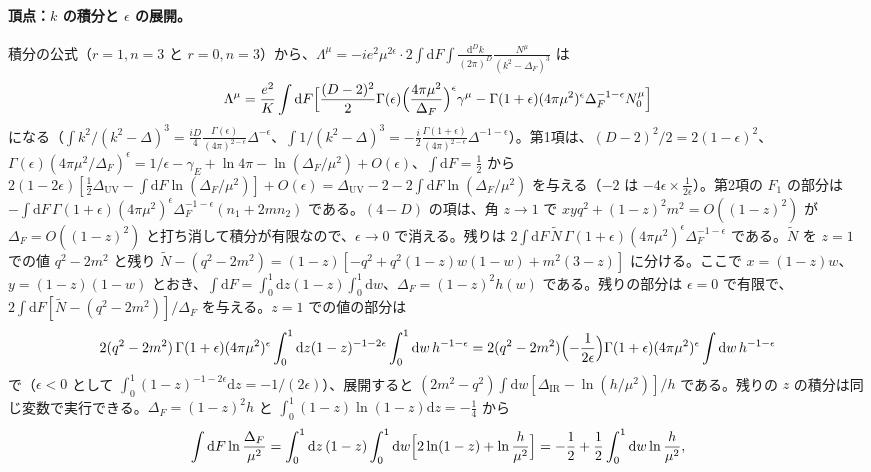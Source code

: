 \documentclass[a4paper,10pt]{ltjsarticle}
\newcommand{\dd}{\mathrm{d}}
\newcommand{\DUV}{\Delta_{\mathrm{UV}}}
\newcommand{\DIR}{\Delta_{\mathrm{IR}}}
\begin{document}
\paragraph{頂点：$k$ の積分と $\epsilon$ の展開。}積分の公式（$r=1,n=3$ と $r=0,n=3$）から、$\Lambda^\mu=-ie^2\mu^{2\epsilon}\cdot2\int\dd F\int\frac{\dd^Dk}{(2\pi)^D}\frac{N^\mu}{(k^2-\Delta_F)^3}$ は
\begin{equation*}
\Lambda^\mu=\frac{e^2}{K}\int\dd F\Bigl[\frac{(D-2)^2}{2}\Gamma(\epsilon)\Bigl(\frac{4\pi\mu^2}{\Delta_F}\Bigr)^{\epsilon}\gamma^\mu-\Gamma(1+\epsilon)(4\pi\mu^2)^\epsilon\Delta_F^{-1-\epsilon}N_0^\mu\Bigr]
\end{equation*}
になる（$\int k^2/(k^2-\Delta)^3=\frac{iD}{4}\frac{\Gamma(\epsilon)}{(4\pi)^{2-\epsilon}}\Delta^{-\epsilon}$、$\int1/(k^2-\Delta)^3=-\frac{i}{2}\frac{\Gamma(1+\epsilon)}{(4\pi)^{2-\epsilon}}\Delta^{-1-\epsilon}$）。第1項は、$(D-2)^2/2=2(1-\epsilon)^2$、$\Gamma(\epsilon)(4\pi\mu^2/\Delta_F)^\epsilon=1/\epsilon-\gamma_E+\ln4\pi-\ln(\Delta_F/\mu^2)+O(\epsilon)$、$\int\dd F=\frac12$ から $2(1-2\epsilon)[\frac12\DUV-\int\dd F\ln(\Delta_F/\mu^2)]+O(\epsilon)=\DUV-2-2\int\dd F\ln(\Delta_F/\mu^2)$ を与える（$-2$ は $-4\epsilon\times\frac{1}{2\epsilon}$）。第2項の $F_1$ の部分は $-\int\dd F\,\Gamma(1+\epsilon)(4\pi\mu^2)^\epsilon\Delta_F^{-1-\epsilon}(n_1+2mn_2)$ である。$(4-D)$ の項は、角 $z\to1$ で $xy q^2+(1-z)^2m^2=O((1-z)^2)$ が $\Delta_F=O((1-z)^2)$ と打ち消して積分が有限なので、$\epsilon\to0$ で消える。残りは $2\int\dd F\,\tilde N\,\Gamma(1+\epsilon)(4\pi\mu^2)^\epsilon\Delta_F^{-1-\epsilon}$ である。$\tilde N$ を $z=1$ での値 $q^2-2m^2$ と残り $\tilde N-(q^2-2m^2)=(1-z)[-q^2+q^2(1-z)w(1-w)+m^2(3-z)]$ に分ける。ここで $x=(1-z)w$、$y=(1-z)(1-w)$ とおき、$\int\dd F=\int_0^1\dd z(1-z)\int_0^1\dd w$、$\Delta_F=(1-z)^2h(w)$ である。残りの部分は $\epsilon=0$ で有限で、$2\int\dd F[\tilde N-(q^2-2m^2)]/\Delta_F$ を与える。$z=1$ での値の部分は
\begin{equation*}
2(q^2-2m^2)\,\Gamma(1+\epsilon)(4\pi\mu^2)^\epsilon\int_0^1\dd z(1-z)^{-1-2\epsilon}\int_0^1\dd w\,h^{-1-\epsilon}
=2(q^2-2m^2)\Bigl(-\frac{1}{2\epsilon}\Bigr)\Gamma(1+\epsilon)(4\pi\mu^2)^\epsilon\int\dd w\,h^{-1-\epsilon}
\end{equation*}
で（$\epsilon<0$ として $\int_0^1(1-z)^{-1-2\epsilon}\dd z=-1/(2\epsilon)$）、展開すると $(2m^2-q^2)\int\dd w[\DIR-\ln(h/\mu^2)]/h$ である。残りの $z$ の積分は同じ変数で実行できる。$\Delta_F=(1-z)^2h$ と $\int_0^1(1-z)\ln(1-z)\dd z=-\frac14$ から
\begin{equation*}
\int\dd F\ln\frac{\Delta_F}{\mu^2}=\int_0^1\dd z\,(1-z)\int_0^1\dd w\Bigl[2\ln(1-z)+\ln\frac{h}{\mu^2}\Bigr]=-\frac12+\frac12\int_0^1\dd w\ln\frac{h}{\mu^2},
\end{equation*}
\end{document}
